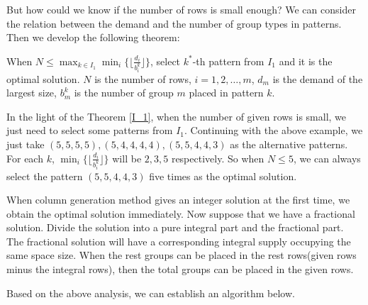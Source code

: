 But how could we know if the number of rows is small enough?
We can consider the relation between the demand and the number of group types in patterns. Then we develop the following theorem:
\begin{thm}\label{I_1}
  When $N \leq \max_{k\in I_1} \min_{i} \{\lfloor \frac{d_i}{b_i^k}\rfloor\}$, select $k^*$-th pattern from $I_1$ and it is the optimal solution.
  $N$ is the number of rows, $i = 1,2,\ldots, m$, $d_m$ is the demand of the largest size, $b_m^k$ is the number of group $m$ placed in pattern $k$.
\end{thm}

In the light of the Theorem \ref{I_1}, when the number of given rows is small, we just need to select some patterns from $I_1$.
Continuing with the above example, we just take $(5,5,5,5), (5,4,4,4,4), (5,5,4,4,3)$ as the alternative patterns. For each $k$, $\min_{i} \{\lfloor \frac{d_i}{b_i^k}\rfloor\}$ will be $2,3,5$ respectively. So when $N \leq 5$, we can always select the pattern $(5,5,4,4,3)$ five times as the optimal solution.

When column generation method gives an integer solution at the first time, we obtain the optimal solution immediately. Now suppose that we have a fractional solution. Divide the solution into a pure integral part and the fractional part. The fractional solution will have a corresponding integral supply occupying the same space size. When the rest groups can be placed in the rest rows(given rows minus the integral rows), then the total groups can be placed in the given rows.

%

Based on the above analysis, we can establish an algorithm below.


